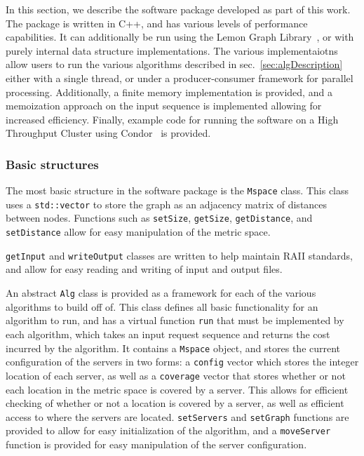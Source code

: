 In this section, we describe the software package developed as part of this work. The package is written in C++, and has various levels of performance capabilities. It can additionally be run using the Lemon Graph Library~\cite{lemon}, or with purely internal data structure implementations. The various implementaiotns allow users to run the various algorithms described in sec.~\ref{sec:algDescription} either with a single thread, or under a producer-consumer framework for parallel processing. Additionally, a finite memory implementation is provided, and a memoization approach on the input sequence is implemented allowing for increased efficiency. Finally, example code for running the software on a High Throughput Cluster using Condor~\cite{htcondor} is provided.

\subsubsection*{Basic structures}

The most basic structure in the software package is the \texttt{Mspace} class. This class uses a \texttt{std::vector} to store the graph as an adjacency matrix of distances between nodes. Functions such as \texttt{setSize}, \texttt{getSize}, \texttt{getDistance}, and \texttt{setDistance} allow for easy manipulation of the metric space.

\texttt{getInput} and \texttt{writeOutput} classes are written to help maintain RAII standards, and allow for easy reading and writing of input and output files. 

An abstract \texttt{Alg} class is provided as a framework for each of the various algorithms to build off of. This class defines all basic functionality for an algorithm to run, and has a virtual function \texttt{run} that must be implemented by each algorithm, which takes an input request sequence and returns the cost incurred by the algorithm. It contains a \texttt{Mspace} object, and stores the current configuration of the servers in two forms: a \texttt{config} vector which stores the integer location of each server, as well as a \texttt{coverage} vector that stores whether or not each location in the metric space is covered by a server. This allows for efficient checking of whether or not a location is covered by a server, as well as efficient access to where the servers are located. \texttt{setServers} and \texttt{setGraph} functions are provided to allow for easy initialization of the algorithm, and a \texttt{moveServer} function is provided for easy manipulation of the server configuration.

